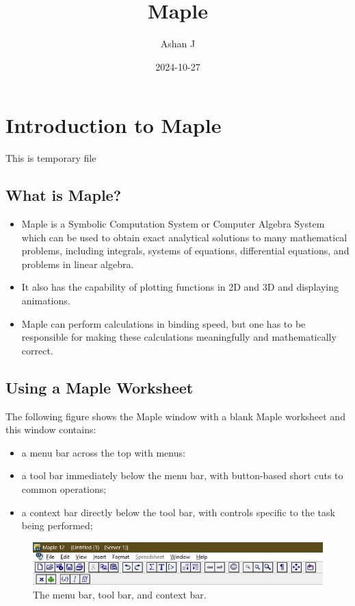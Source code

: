 \documentclass[
]{book}
\title{Maple}
\author{Ashan J}
\date{2024-10-27}
\providecommand{\tightlist}{%
  \setlength{\itemsep}{0pt}\setlength{\parskip}{0pt}}
\theoremstyle{definition}
\theoremstyle{definition}
\theoremstyle{definition}
\theoremstyle{definition}
\theoremstyle{remark}
\begin{document}
\maketitle

{
\setcounter{tocdepth}{1}
\tableofcontents
}
\chapter{Introduction to Maple}\label{introduction-to-maple}

This is temporary file

\section{What is Maple?}\label{what-is-maple}

\begin{itemize}
\tightlist
\item
  Maple is a Symbolic Computation System or Computer Algebra System which can be used to obtain exact analytical solutions to many mathematical problems, including integrals, systems of equations, differential equations, and problems in linear algebra.
\item
  It also has the capability of plotting functions in 2D and 3D and displaying animations.
\item
  Maple can perform calculations in binding speed, but one has to be responsible for making these calculations meaningfully and mathematically correct.
\end{itemize}

\section{Using a Maple Worksheet}\label{using-a-maple-worksheet}

The following figure shows the Maple window with a blank Maple worksheet and this window contains:

\begin{itemize}
\tightlist
\item
  a menu bar across the top with menus:
\item
  a tool bar immediately below the menu bar, with button-based short cuts to common operations;
\item
  a context bar directly below the tool bar, with controls specific to the task being performed;
\end{itemize}

\begin{figure}
\centering
\includegraphics{figures/Lesson 1/fig1.png}
\caption{The menu bar, tool bar, and context bar.}
\end{figure}
\end{document}

